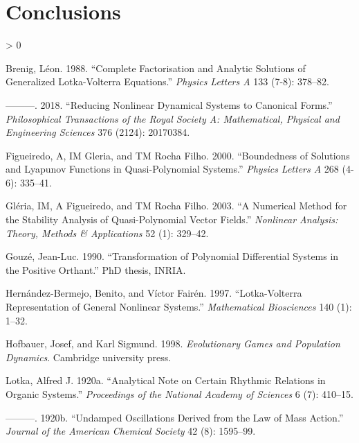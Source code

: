 \documentclass{article}
\newlength{\cslhangindent}
\newenvironment{CSLReferences}[2] %
 {%
  \setlength{\parindent}{0pt}
  \ifodd #1 \everypar{\setlength{\hangindent}{\cslhangindent}}\ignorespaces\fi
  \ifnum #2 > 0
  \setlength{\parskip}{#2\baselineskip}
  \fi
 }%
 {}
\begin{document}
\hypertarget{conclusions}{%
\section*{Conclusions}\label{conclusions}}

\hypertarget{refs}{}
\begin{CSLReferences}{1}{0}
\leavevmode\hypertarget{ref-brenig1988complete}{}%
Brenig, Léon. 1988. {``Complete Factorisation and Analytic Solutions of
Generalized Lotka-Volterra Equations.''} \emph{Physics Letters A} 133
(7-8): 378--82.

\leavevmode\hypertarget{ref-brenig2018reducing}{}%
---------. 2018. {``Reducing Nonlinear Dynamical Systems to Canonical
Forms.''} \emph{Philosophical Transactions of the Royal Society A:
Mathematical, Physical and Engineering Sciences} 376 (2124): 20170384.

\leavevmode\hypertarget{ref-figueiredo2000boundedness}{}%
Figueiredo, A, IM Gleria, and TM Rocha Filho. 2000. {``Boundedness of
Solutions and Lyapunov Functions in Quasi-Polynomial Systems.''}
\emph{Physics Letters A} 268 (4-6): 335--41.

\leavevmode\hypertarget{ref-gleria2003numerical}{}%
Gléria, IM, A Figueiredo, and TM Rocha Filho. 2003. {``A Numerical
Method for the Stability Analysis of Quasi-Polynomial Vector Fields.''}
\emph{Nonlinear Analysis: Theory, Methods \& Applications} 52 (1):
329--42.

\leavevmode\hypertarget{ref-gouze1990transformation}{}%
Gouzé, Jean-Luc. 1990. {``Transformation of Polynomial Differential
Systems in the Positive Orthant.''} PhD thesis, INRIA.

\leavevmode\hypertarget{ref-hernandez1997lotka}{}%
Hernández-Bermejo, Benito, and Víctor Fairén. 1997. {``Lotka-Volterra
Representation of General Nonlinear Systems.''} \emph{Mathematical
Biosciences} 140 (1): 1--32.

\leavevmode\hypertarget{ref-hofbauer1998evolutionary}{}%
Hofbauer, Josef, and Karl Sigmund. 1998. \emph{Evolutionary Games and
Population Dynamics}. Cambridge university press.

\leavevmode\hypertarget{ref-lotka1920analytical}{}%
Lotka, Alfred J. 1920a. {``Analytical Note on Certain Rhythmic Relations
in Organic Systems.''} \emph{Proceedings of the National Academy of
Sciences} 6 (7): 410--15.

\leavevmode\hypertarget{ref-lotka1920undamped}{}%
---------. 1920b. {``Undamped Oscillations Derived from the Law of Mass
Action.''} \emph{Journal of the American Chemical Society} 42 (8):
1595--99.


\end{CSLReferences}
\end{document}

